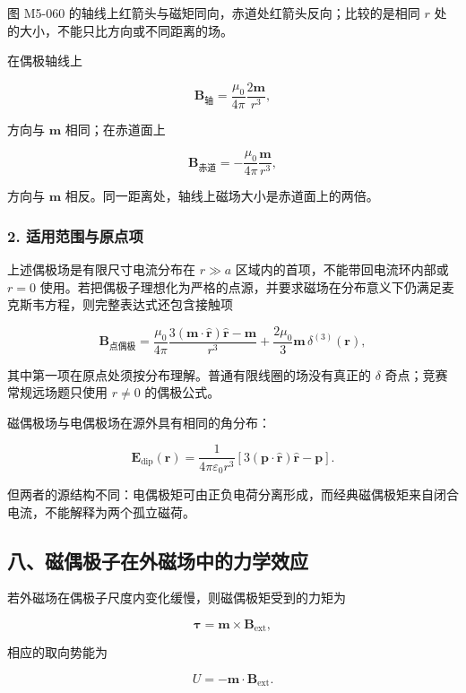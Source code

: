 图 M5-060 的轴线上红箭头与磁矩同向，赤道处红箭头反向；比较的是相同 \(r\)
处的大小，不能只比方向或不同距离的场。

在偶极轴线上

\[
\mathbf B_{\mathrm{\text{轴}}}
=\frac{\mu_0}{4\pi}\frac{2\mathbf m}{r^3},
\]

方向与 \(\mathbf m\) 相同；在赤道面上

\[
\mathbf B_{\mathrm{\text{赤道}}}
=-\frac{\mu_0}{4\pi}\frac{\mathbf m}{r^3},
\]

方向与 \(\mathbf m\) 相反。同一距离处，轴线上磁场大小是赤道面上的两倍。

\subsubsection{2.
适用范围与原点项}\label{m5:ux9002ux7528ux8303ux56f4ux4e0eux539fux70b9ux9879}

上述偶极场是有限尺寸电流分布在 \(r\gg a\)
区域内的首项，不能带回电流环内部或 \(r=0\)
使用。若把偶极子理想化为严格的点源，并要求磁场在分布意义下仍满足麦克斯韦方程，则完整表达式还包含接触项

\[
\mathbf B_{\mathrm{\text{点偶极}}}
=\frac{\mu_0}{4\pi}
\frac{3(\mathbf m\cdot\hat{\mathbf r})\hat{\mathbf r}-\mathbf m}{r^3}
+\frac{2\mu_0}{3}\mathbf m\,\delta^{(3)}(\mathbf r),
\]

其中第一项在原点处须按分布理解。普通有限线圈的场没有真正的 \(\delta\)
奇点；竞赛常规远场题只使用 \(r\ne0\) 的偶极公式。

磁偶极场与电偶极场在源外具有相同的角分布：

\[
\mathbf E_{\mathrm{dip}}(\mathbf r)
=\frac{1}{4\pi\varepsilon_0r^3}
\left[3(\mathbf p\cdot\hat{\mathbf r})\hat{\mathbf r}-\mathbf p\right].
\]

但两者的源结构不同：电偶极矩可由正负电荷分离形成，而经典磁偶极矩来自闭合电流，不能解释为两个孤立磁荷。

\subsection{八、磁偶极子在外磁场中的力学效应}\label{m5:ux516bux78c1ux5076ux6781ux5b50ux5728ux5916ux78c1ux573aux4e2dux7684ux529bux5b66ux6548ux5e94}

若外磁场在偶极子尺度内变化缓慢，则磁偶极矩受到的力矩为

\[
\boxed{\boldsymbol\tau=\mathbf m\times\mathbf B_{\mathrm{ext}}},
\]

相应的取向势能为

\[
\boxed{U=-\mathbf m\cdot\mathbf B_{\mathrm{ext}}}.
\]

